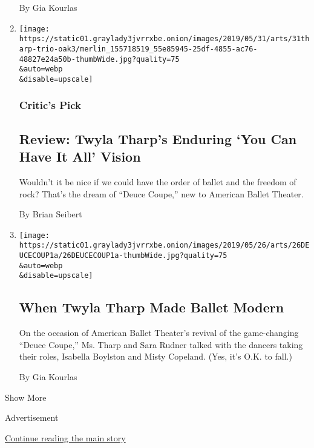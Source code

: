 \begin{enumerate}
  By Gia Kourlas
\item
  \href{/2019/05/31/arts/dance/twyla-tharp-review.html}{}

  \texttt{[image: https://static01.graylady3jvrrxbe.onion/images/2019/05/31/arts/31tharp-trio-oak3/merlin\_155718519\_55e85945-25df-4855-ac76-48827e24a50b-thumbWide.jpg?quality=75\\\&auto=webp\\\&disable=upscale]}

  \hypertarget{critics-pick}{%
  \subsubsection{Critic's Pick}\label{critics-pick}}

  \hypertarget{review-twyla-tharps-enduring-you-can-have-it-all-vision}{%
  \subsection{Review: Twyla Tharp's Enduring `You Can Have It All'
  Vision}\label{review-twyla-tharps-enduring-you-can-have-it-all-vision}}

  Wouldn't it be nice if we could have the order of ballet and the
  freedom of rock? That's the dream of ``Deuce Coupe,'' new to American
  Ballet Theater.

  By Brian Seibert
\item
  \href{/2019/05/22/arts/dance/twyla-tharp-deuce-coupe-misty-copeland.html}{}

  \texttt{[image: https://static01.graylady3jvrrxbe.onion/images/2019/05/26/arts/26DEUCECOUP1a/26DEUCECOUP1a-thumbWide.jpg?quality=75\\\&auto=webp\\\&disable=upscale]}

  \hypertarget{when-twyla-tharp-made-ballet-modern}{%
  \subsection{When Twyla Tharp Made Ballet
  Modern}\label{when-twyla-tharp-made-ballet-modern}}

  On the occasion of American Ballet Theater's revival of the
  game-changing ``Deuce Coupe,'' Ms. Tharp and Sara Rudner talked with
  the dancers taking their roles, Isabella Boylston and Misty Copeland.
  (Yes, it's O.K. to fall.)

  By Gia Kourlas
\end{enumerate}

Show More

Advertisement

\protect\hyperlink{after-mid1}{Continue reading the main story}

